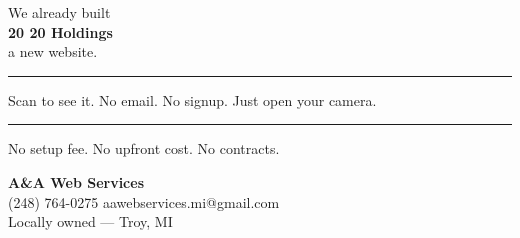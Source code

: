\documentclass[11pt,letterpaper]{article}
\begin{document}
\begin{center}

\newcommand{\businessname}{20 20 Holdings}

\vspace*{0.1in}

{\fontsize{18}{22}\selectfont We already built}\\[0.1in]
{\fontsize{44}{48}\selectfont\bfseries \businessname}\\[0.1in]
{\fontsize{18}{22}\selectfont a new website.}

\vspace{0.3in}
\noindent\rule{\linewidth}{0.8pt}
\vspace{0.3in}

{\fontsize{15}{19}\selectfont Scan to see it. No email. No signup. Just open your camera.}

\vspace{0.35in}


\vspace{0.35in}
\noindent\rule{\linewidth}{0.8pt}
\vspace{0.3in}

{\fontsize{14}{18}\selectfont No setup fee. No upfront cost. No contracts.}

\vspace{0.3in}

{\fontsize{20}{24}\selectfont\bfseries A\&A Web Services}\\[0.15in]
{\fontsize{15}{19}\selectfont (248) 764-0275 \quad aawebservices.mi@gmail.com}\\[0.1in]
{\fontsize{12}{16}\selectfont Locally owned --- Troy, MI}

\vspace*{\fill}

\end{center}
\hfill{\color{gray!70}\fontsize{5}{6}}
\end{document}
